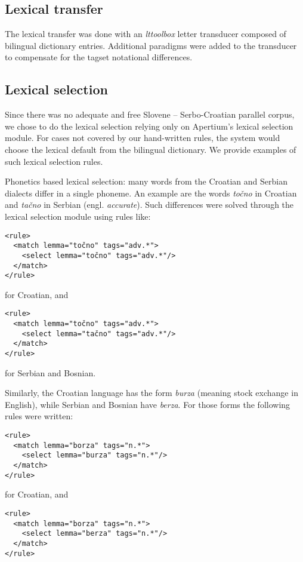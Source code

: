 \subsection{Lexical transfer}
The lexical transfer was done with an \emph{lttoolbox} letter
transducer composed of bilingual dictionary entries. Additional
paradigms were added to the transducer to compensate for the tagset
notational differences.

\subsection{Lexical selection}

Since there was no adequate and free Slovene -- Serbo-Croatian parallel corpus, 
we chose to do the lexical selection relying only on Apertium's lexical selection module.
For cases not covered by our hand-written rules, the system would choose the lexical 
default from the bilingual dictionary.
We provide examples of such lexical selection rules.

Phonetics based lexical selection: many words from the Croatian and Serbian dialects differ in a single phoneme.
An example are the words \emph{točno} in Croatian and \emph{tačno} in Serbian (engl. \emph{accurate}).
Such differences were solved through the lexical selection module using rules like:

{\small
\begin{Verbatim}
<rule>
  <match lemma="točno" tags="adv.*">
    <select lemma="točno" tags="adv.*"/>
  </match>
</rule>
\end{Verbatim}
}
for Croatian, and
{\small
\begin{Verbatim}
<rule>
  <match lemma="točno" tags="adv.*">
    <select lemma="tačno" tags="adv.*"/>
  </match>
</rule>
\end{Verbatim}
}
for Serbian and Bosnian.

Similarly, the Croatian language has the form \emph{burza} (meaning stock exchange in English), while Serbian and Bosnian have \emph{berza}. 
For those forms the following rules were written:

{\small
\begin{Verbatim}
<rule>
  <match lemma="borza" tags="n.*">
    <select lemma="burza" tags="n.*"/>
  </match>
</rule>
\end{Verbatim}
}
for Croatian, and 
{\small
\begin{Verbatim}
<rule>
  <match lemma="borza" tags="n.*">
    <select lemma="berza" tags="n.*"/>
  </match>
</rule>

\end{Verbatim}
}


